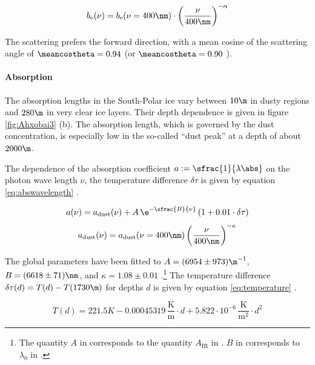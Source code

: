 \begin{equation}
  b_\text{e}(\nu) = b_\text{e}(\nu = 400\nm) \cdot \left(\frac{\nu}{400\nm}\right)^{-\alpha}
  \label{eq:escawavelength}
\end{equation}

The scattering prefers the forward direction, with a mean cosine of the scattering angle of $\meancostheta = 0.94$ \cite[paragraph 9]{ackermann} (or $\meancostheta = 0.90$ \cite{icepaper}).


\paragraph{Absorption}
The absorption lengths in the South-Polar ice vary between $10\m$ in dusty regions and $280\m$ in very clear ice layers. Their depth dependence is given in figure \ref{fig:Ahxobai3} (b). The absorption length, which is governed by the dust concentration, is especially low in the so-called ``dust peak'' at a depth of about $2000\m$. \cite{ackermann, ppcpaper, icepaper}

The dependence of the absorption coefficient $a := \sfrac{1}{\lambda\abs}$ on the photon wave length $\nu$, the temperature difference $\delta\tau$ is given by equation \ref{eq:abswavelength} \cite{icepaper}.

\begin{equation}
  a(\nu) = a_\text{dust}(\nu) + A\,\e^{-\sfrac{B}{\nu}}\, (1 + 0.01 \cdot \delta\tau)
  \label{eq:abswavelength}
\end{equation}
\begin{equation}
  a_\text{dust}(\nu) = a_\text{dust}(\nu = 400\nm) \left(\frac{\nu}{400\nm}\right)^{-\kappa}
\end{equation}

The global parameters have been fitted to $A = (6954 \pm 973)\m^{-1}$, $B = (6618 \pm 71)\nm$, and $\kappa = 1.08 \pm 0.01$ \cite[section 5.2]{ackermann}.\footnote{The quantity $A$ in \cite{icepaper} corresponds to the quantity $A_\text{IR}$ in \cite{ackermann}. $B$ in \cite{icepaper} corresponds to $\lambda_0$ in \cite{ackermann}.}
The temperature difference $\delta\tau(d) = T(d) - T(1730\m)$ for depths $d$ is given by equation \ref{eq:temperature} \cite{icepaper}.

\begin{equation}
  T(d) = 221.5\unit{K} - 0.00045319\,\frac{\text{K}}{\text{m}}\cdot d + 5.822 \cdot 10^{-6}\,\frac{\text{K}}{\text{m}^2} \cdot d^2
  \label{eq:temperature}
\end{equation}


